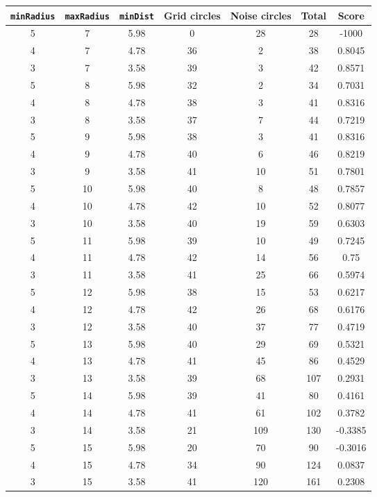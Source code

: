 \documentclass[letterpaper, 12pt]{article}
\begin{document}
\begin{longtable}{|c|c|c|c|c|c|c|}
\hline
\textbf{\texttt{minRadius}} & \textbf{\texttt{maxRadius}} & \textbf{\texttt{minDist}} & \textbf{Grid circles} & \textbf{Noise circles} & \textbf{Total} & \textbf{Score} \\
\hline
5 & 7 & 5.98 & 0 & 28 & 28 & -1000 \\
\hline
4 & 7 & 4.78 & 36 & 2 & 38 & 0.8045 \\
\hline
3 & 7 & 3.58 & 39 & 3 & 42 & 0.8571 \\
\hline
5 & 8 & 5.98 & 32 & 2 & 34 & 0.7031 \\
\hline
4 & 8 & 4.78 & 38 & 3 & 41 & 0.8316 \\
\hline
3 & 8 & 3.58 & 37 & 7 & 44 & 0.7219 \\
\hline
5 & 9 & 5.98 & 38 & 3 & 41 & 0.8316 \\
\hline
4 & 9 & 4.78 & 40 & 6 & 46 & 0.8219 \\
\hline
3 & 9 & 3.58 & 41 & 10 & 51 & 0.7801 \\
\hline
5 & 10 & 5.98 & 40 & 8 & 48 & 0.7857 \\
\hline
4 & 10 & 4.78 & 42 & 10 & 52 & 0.8077 \\
\hline
3 & 10 & 3.58 & 40 & 19 & 59 & 0.6303 \\
\hline
5 & 11 & 5.98 & 39 & 10 & 49 & 0.7245 \\
\hline
4 & 11 & 4.78 & 42 & 14 & 56 & 0.75 \\
\hline
3 & 11 & 3.58 & 41 & 25 & 66 & 0.5974 \\
\hline
5 & 12 & 5.98 & 38 & 15 & 53 & 0.6217 \\
\hline
4 & 12 & 4.78 & 42 & 26 & 68 & 0.6176 \\
\hline
3 & 12 & 3.58 & 40 & 37 & 77 & 0.4719 \\
\hline
5 & 13 & 5.98 & 40 & 29 & 69 & 0.5321 \\
\hline
4 & 13 & 4.78 & 41 & 45 & 86 & 0.4529 \\
\hline
3 & 13 & 3.58 & 39 & 68 & 107 & 0.2931 \\
\hline
5 & 14 & 5.98 & 39 & 41 & 80 & 0.4161 \\
\hline
4 & 14 & 4.78 & 41 & 61 & 102 & 0.3782 \\
\hline
3 & 14 & 3.58 & 21 & 109 & 130 & -0.3385 \\
\hline
5 & 15 & 5.98 & 20 & 70 & 90 & -0.3016 \\
\hline
4 & 15 & 4.78 & 34 & 90 & 124 & 0.0837 \\
\hline
3 & 15 & 3.58 & 41 & 120 & 161 & 0.2308 \\

\end{longtable}
\end{document}
